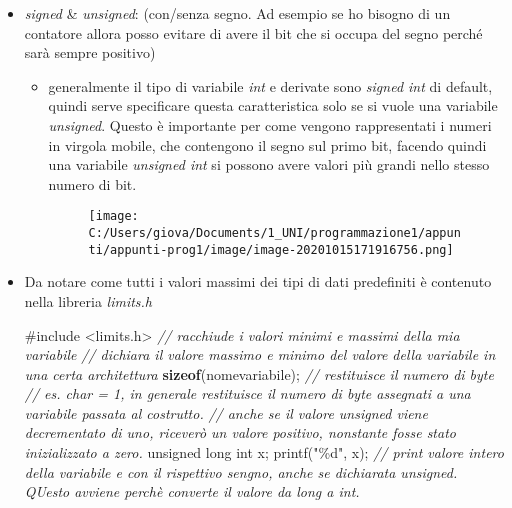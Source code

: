 \documentclass[
]{article}
\newenvironment{Shaded}{}{}
\newcommand{\CommentTok}[1]{\textcolor[rgb]{0.38,0.63,0.69}{\textit{#1}}}
\newcommand{\DataTypeTok}[1]{\textcolor[rgb]{0.56,0.13,0.00}{#1}}
\newcommand{\ImportTok}[1]{#1}
\newcommand{\KeywordTok}[1]{\textcolor[rgb]{0.00,0.44,0.13}{\textbf{#1}}}
\newcommand{\NormalTok}[1]{#1}
\newcommand{\PreprocessorTok}[1]{\textcolor[rgb]{0.74,0.48,0.00}{#1}}
\newcommand{\StringTok}[1]{\textcolor[rgb]{0.25,0.44,0.63}{#1}}
\begin{document}
\begin{itemize}
\item
  \emph{signed} \& \emph{unsigned}: (con/senza segno. Ad esempio se ho
  bisogno di un contatore allora posso evitare di avere il bit che si
  occupa del segno perché sarà sempre positivo)

  \begin{itemize}
  \item
    generalmente il tipo di variabile \emph{int} e derivate sono
    \emph{signed int} di default, quindi serve specificare questa
    caratteristica solo se si vuole una variabile \emph{unsigned}.
    Questo è importante per come vengono rappresentati i numeri in
    virgola mobile, che contengono il segno sul primo bit, facendo
    quindi una variabile \emph{unsigned int} si possono avere valori più
    grandi nello stesso numero di bit.

    \begin{figure}
    \centering
    \texttt{[image: C:/Users/giova/Documents/1\_UNI/programmazione1/appunti/appunti-prog1/image/image-20201015171916756.png]}
    \caption{}
    \end{figure}
  \end{itemize}
\item
  Da notare come tutti i valori massimi dei tipi di dati predefiniti è
  contenuto nella libreria \emph{limits.h}

\begin{Shaded}
\begin{Highlighting}[]
\PreprocessorTok{\#include }\ImportTok{\textless{}limits.h\textgreater{}}
\CommentTok{// racchiude i valori minimi e massimi della mia variabile}
\CommentTok{// dichiara il valore massimo e minimo del valore della variabile in una certa architettura}
\KeywordTok{sizeof}\NormalTok{(nomevariabile); }\CommentTok{// restituisce il numero di byte}
\CommentTok{// es. char = 1, in generale restituisce il numero di byte assegnati a una variabile passata al costrutto.}
\CommentTok{// anche se il valore unsigned viene decrementato di uno, riceverò un valore positivo, nonstante fosse stato inizializzato a zero.}
\DataTypeTok{unsigned} \DataTypeTok{long} \DataTypeTok{int}\NormalTok{ x;}
\NormalTok{printf(}\StringTok{"\%d"}\NormalTok{, x); }\CommentTok{// print valore intero della variabile e con il rispettivo sengno, anche se dichiarata unsigned. QUesto avviene perchè converte il valore da long a int.}
\end{Highlighting}
\end{Shaded}
\end{itemize}
\end{document}
